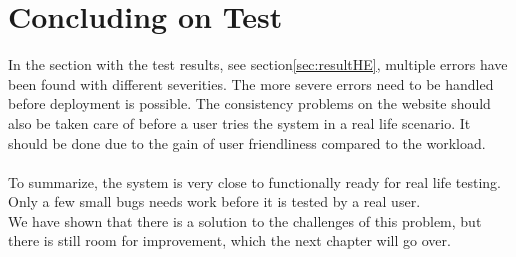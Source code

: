 \section*{Concluding on Test}
In the section with the test results, see section\vref{sec:resultHE}, multiple errors have been found with different severities. The more severe errors need to be handled before deployment is possible. The consistency problems on the website should also be taken care of before a user tries the system in a real life scenario. It should be done due to the gain of user friendliness compared to the workload. \\
\\
To summarize, the system is very close to functionally ready for real life testing. Only a few small bugs needs work before it is tested by a real user.\\
We have shown that there is a solution to the challenges of this problem, but there is still room for improvement, which the next chapter will go over.